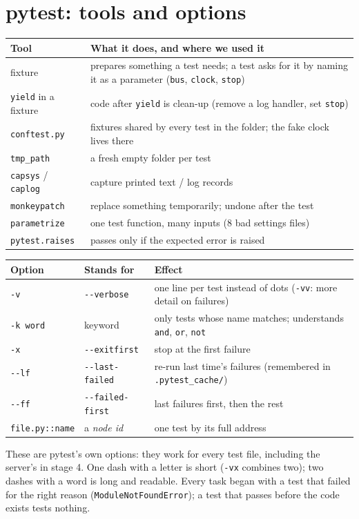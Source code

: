 \documentclass[11pt,a4paper]{article}
\begin{document}
\section{pytest: tools and options}
\begin{center}
\renewcommand{\arraystretch}{1.15}
\begin{tabularx}{\textwidth}{l X}
\toprule
\textbf{Tool} & \textbf{What it does, and where we used it} \\
\midrule
fixture & prepares something a test needs; a test asks for it by naming it as a parameter (\texttt{bus}, \texttt{clock}, \texttt{stop}) \\
\texttt{yield} in a fixture & code after \texttt{yield} is clean-up (remove a log handler, set \texttt{stop}) \\
\texttt{conftest.py} & fixtures shared by every test in the folder; the fake clock lives there \\
\texttt{tmp\_path} & a fresh empty folder per test \\
\texttt{capsys} / \texttt{caplog} & capture printed text / log records \\
\texttt{monkeypatch} & replace something temporarily; undone after the test \\
\texttt{parametrize} & one test function, many inputs (8 bad settings files) \\
\texttt{pytest.raises} & passes only if the expected error is raised \\
\bottomrule
\end{tabularx}
\end{center}
\begin{center}
\begin{tabularx}{\textwidth}{l l X}
\toprule
\textbf{Option} & \textbf{Stands for} & \textbf{Effect} \\
\midrule
\texttt{-v} & \texttt{-{}-verbose} & one line per test instead of dots (\texttt{-vv}: more detail on failures) \\
\texttt{-k word} & keyword & only tests whose name matches; understands \texttt{and}, \texttt{or}, \texttt{not} \\
\texttt{-x} & \texttt{-{}-exitfirst} & stop at the first failure \\
\texttt{-{}-lf} & \texttt{-{}-last-failed} & re-run last time's failures (remembered in \texttt{.pytest\_cache/}) \\
\texttt{-{}-ff} & \texttt{-{}-failed-first} & last failures first, then the rest \\
\texttt{file.py::name} & a \emph{node id} & one test by its full address \\
\bottomrule
\end{tabularx}
\end{center}
\noindent These are pytest's own options: they work for every test file, including the server's
in stage 4. One dash with a letter is short (\texttt{-vx} combines two); two dashes with a word is
long and readable. Every task began with a test that failed for the right reason
(\texttt{ModuleNotFoundError}); a test that passes before the code exists tests nothing.
\end{document}
